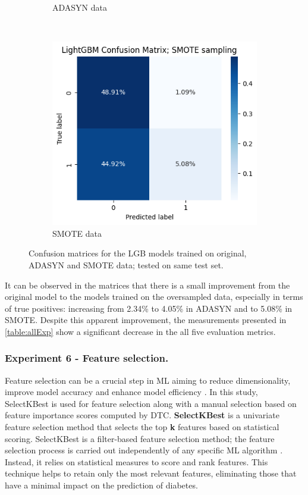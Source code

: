 \documentclass[runningheads]{llncs}
\begin{document}
\begin{figure}[htbp]
\begin{subfigure}[t]{0.3\textwidth}
        \caption{ADASYN data}
        \label{Fig:exp2_matrix_adasyn}
    \end{subfigure}
    ~ 
    \begin{subfigure}[t]{0.3\textwidth}
        \centering
        \includegraphics[width=0.99\linewidth]{images/exp2_matrix_smote.png}
        \caption{SMOTE data}
        \label{Fig:exp2_matrix_smote}
    \end{subfigure}
    \caption{Confusion matrices for the LGB models trained on original, ADASYN and SMOTE data; tested on same test set.}
    \label{fig:exp2_matrices}
\end{figure}


It can be observed in the matrices that there is a small improvement from the original model to the models trained on the oversampled data, especially in terms of true positives: increasing from 2.34\% to 4.05\%  in ADASYN and to 5.08\% in SMOTE. Despite this apparent improvement, the measurements presented in \autoref{table:allExp} show a significant decrease in the all five evaluation metrics.


\subsubsection{Experiment 6 - Feature selection.}
\label{section:exp_6}
Feature selection can be a crucial step in ML aiming to reduce dimensionality, improve model accuracy and enhance model efficiency \cite{BARBIERI2024123667}. In this study, SelectKBest is used for feature selection along with a manual selection based on feature importance scores computed by DTC. \textbf {SelectKBest} is a univariate feature selection method that selects the top \textbf{k} features based on statistical scoring.  SelectKBest is a filter-based feature selection method; the feature selection process is carried out independently of any specific ML algorithm \cite{selectkbest}. Instead, it relies on statistical measures to score and rank features.
This technique helps to retain only the most relevant features, eliminating those that have a minimal impact on the prediction of diabetes. 
\end{document}
